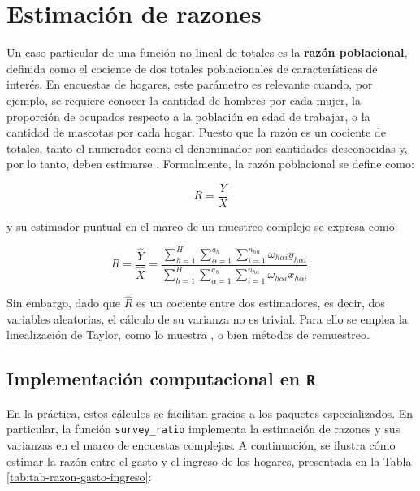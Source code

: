 \documentclass[
  spanish,
  12pt,
]{book}
\begin{document}
\section{Estimación de razones}\label{estimaciuxf3n-de-razones}

Un caso particular de una función no lineal de totales es la \textbf{razón poblacional}, definida como el cociente de dos totales poblacionales de características de interés. En encuestas de hogares, este parámetro es relevante cuando, por ejemplo, se requiere conocer la cantidad de hombres por cada mujer, la proporción de ocupados respecto a la población en edad de trabajar, o la cantidad de mascotas por cada hogar. Puesto que la razón es un cociente de totales, tanto el numerador como el denominador son cantidades desconocidas y, por lo tanto, deben estimarse \citep{bautista1998}. Formalmente, la razón poblacional se define como:

\[
R = \frac{Y}{X}
\]

y su estimador puntual en el marco de un muestreo complejo se expresa como:

\[
\hat{R} = \frac{\hat{Y}}{\hat{X}}
= \frac{\sum_{h=1}^{H}\sum_{\alpha=1}^{a_{h}}\sum_{i=1}^{n_{h\alpha}}\omega_{h\alpha i} y_{h\alpha i}}
       {\sum_{h=1}^{H}\sum_{\alpha=1}^{a_{h}}\sum_{i=1}^{n_{h\alpha}}\omega_{h\alpha i} x_{h\alpha i}}.
\]

Sin embargo, dado que \(\hat{R}\) es un cociente entre dos estimadores, es decir, dos variables aleatorias, el cálculo de su varianza no es trivial. Para ello se emplea la linealización de Taylor, como lo muestra \citet{Gutierrez2016}, o bien métodos de remuestreo.

\subsection*{\texorpdfstring{Implementación computacional en \texttt{R}}{Implementación computacional en R}}\label{implementaciuxf3n-computacional-en-r}

En la práctica, estos cálculos se facilitan gracias a los paquetes especializados. En particular, la función \texttt{survey\_ratio} implementa la estimación de razones y sus varianzas en el marco de encuestas complejas. A continuación, se ilustra cómo estimar la razón entre el gasto y el ingreso de los hogares, presentada en la Tabla \ref{tab:tab-razon-gasto-ingreso}:
\end{document}
